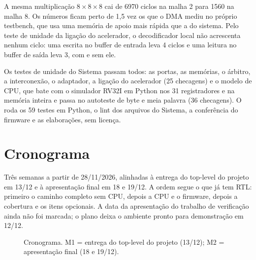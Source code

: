 \documentclass[10pt,a4paper]{article}
\newcommand{\code}[1]{\texttt{\detokenize{#1}}}
\begin{document}
A mesma multiplicação $8 \times 8 \times 8$ cai de 6970 ciclos na malha 2 para 1560 na malha 8. Os
números ficam perto de 1,5 vez os que o DMA mediu no próprio testbench, que usa uma memória de apoio
mais rápida que a do sistema. Pelo teste de unidade da ligação do acelerador, o decodificador local
não acrescenta nenhum ciclo: uma escrita no buffer de entrada leva 4 ciclos e uma leitura no buffer
de saída leva 3, com e sem ele.

Os testes de unidade do Sistema passam todos: as portas, as memórias, o árbitro, a interconexão, o
adaptador, a ligação do acelerador (25 checagens) e o modelo de CPU, que bate com o simulador RV32I
em Python nos 31 registradores e na memória inteira e passa no autoteste de byte e meia palavra (36
checagens). O \code{make check} roda os 59 testes em Python, o lint dos arquivos do Sistema, a
conferência do firmware e as elaborações, sem licença.

\section{Cronograma}

Três semanas a partir de 28/11/2026, alinhadas à entrega do top-level do projeto em 13/12 e à
apresentação final em 18 e 19/12. A ordem segue o que já tem RTL: primeiro o caminho completo sem
CPU, depois a CPU e o firmware, depois a cobertura e os itens opcionais. A data da apresentação do
trabalho de verificação ainda não foi marcada; o plano deixa o ambiente pronto para demonstração em
12/12.

\begin{figure}[htbp]
\centering
{}
\caption{Cronograma. M1 = entrega do top-level do projeto (13/12); M2 = apresentação final
(18 e 19/12).}
\label{fig:gantt}
\end{figure}
\end{document}
